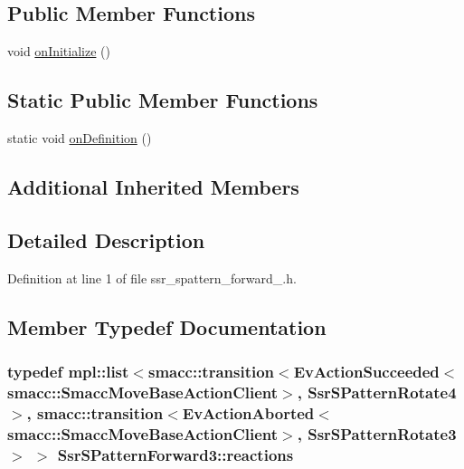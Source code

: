 \subsection*{Public Member Functions}
\begin{DoxyCompactItemize}
\item 
void \hyperlink{structSsrSPatternForward3_a9548fa20d98d23f9b90a1cdaf3c904f9}{on\+Initialize} ()
\end{DoxyCompactItemize}
\subsection*{Static Public Member Functions}
\begin{DoxyCompactItemize}
\item 
static void \hyperlink{structSsrSPatternForward3_ac48e2ef7fa1fcbd44890c24f8e34ef6f}{on\+Definition} ()
\end{DoxyCompactItemize}
\subsection*{Additional Inherited Members}


\subsection{Detailed Description}


Definition at line 1 of file ssr\+\_\+spattern\+\_\+forward\+\_.\+h.



\subsection{Member Typedef Documentation}
\subsubsection[{\texorpdfstring{reactions}{reactions}}]{\setlength{\rightskip}{0pt plus 5cm}typedef mpl\+::list$<${\bf smacc\+::transition}$<$Ev\+Action\+Succeeded$<${\bf smacc\+::\+Smacc\+Move\+Base\+Action\+Client}$>$, {\bf Ssr\+S\+Pattern\+Rotate4}$>$, {\bf smacc\+::transition}$<$Ev\+Action\+Aborted$<${\bf smacc\+::\+Smacc\+Move\+Base\+Action\+Client}$>$, {\bf Ssr\+S\+Pattern\+Rotate3}$>$ $>$ {\bf Ssr\+S\+Pattern\+Forward3\+::reactions}}\hypertarget{structSsrSPatternForward3_a8328e936a0e30e6a11f4cc33d909d997}{}\label{structSsrSPatternForward3_a8328e936a0e30e6a11f4cc33d909d997}


